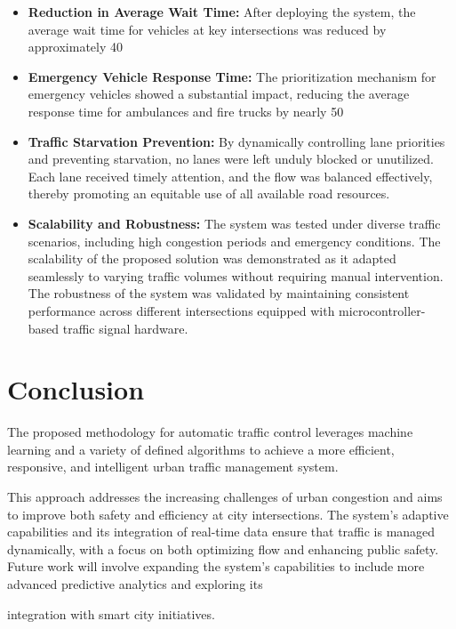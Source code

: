 \documentclass[usenatbib]{tjaa}
\begin{document}
\begin{itemize}
    \item \textbf{Reduction in Average Wait Time:} After deploying the system, the average wait time for vehicles at key intersections was reduced by approximately 40%
    \item \textbf{Emergency Vehicle Response Time:} The prioritization mechanism for emergency vehicles showed a substantial impact, reducing the average response time for ambulances and fire trucks by nearly 50%
    \item \textbf{Traffic Starvation Prevention:} By dynamically controlling lane priorities and preventing starvation, no lanes were left unduly blocked or unutilized. Each lane received timely attention, and the flow was balanced effectively, thereby promoting an equitable use of all available road resources.
    \item \textbf{Scalability and Robustness:} The system was tested under diverse traffic scenarios, including high congestion periods and emergency conditions. The scalability of the proposed solution was demonstrated as it adapted seamlessly to varying traffic volumes without requiring manual intervention. The robustness of the system was validated by maintaining consistent performance across different intersections equipped with microcontroller-based traffic signal hardware.
\end{itemize}



\section{Conclusion}
The proposed methodology for automatic traffic control leverages machine learning and a variety of defined algorithms to achieve a more efficient, responsive, and intelligent urban traffic management system.
\newline{1cm}
\begin{minipage}{0.5\textwidth} %
    \hspace*{5cm} %
    \begin{minipage}{0.3\textwidth}
         This approach addresses the increasing challenges of urban congestion and aims to improve both safety and efficiency at city intersections. The system's adaptive capabilities and its integration of real-time data ensure that traffic is managed dynamically, with a focus on both optimizing flow and enhancing public safety. Future work will involve expanding the system's capabilities to include more advanced predictive analytics and exploring its 
    \end{minipage}
    \hspace*{1cm} %
\end{minipage}
integration with smart city initiatives.

\label{lastpage}
\end{document}
